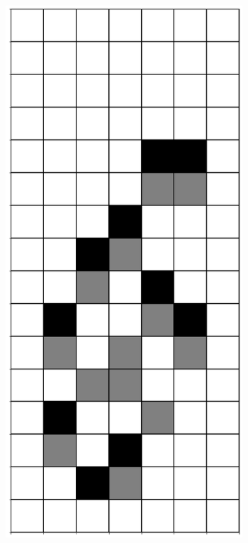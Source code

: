 \documentclass[12pt]{article}
\numberwithin{figure}{section} %
\begin{document}
\begin{figure}[H]
\begin{subfigure}{0.18\textwidth}
     		\subcaption{}
   	\end{subfigure}
     	\begin{subfigure}{0.18\textwidth}
     		\centering
     		\includegraphics[width=\linewidth]{Section4/19.1}

\end{subfigure}
\end{figure}
\end{document}
